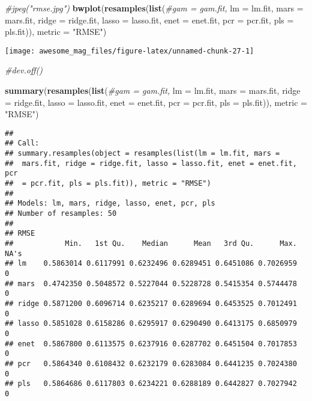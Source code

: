 \documentclass[]{article}
\newenvironment{Shaded}{\begin{snugshade}}{\end{snugshade}}
\newcommand{\KeywordTok}[1]{\textcolor[rgb]{0.13,0.29,0.53}{\textbf{#1}}}
\newcommand{\DataTypeTok}[1]{\textcolor[rgb]{0.13,0.29,0.53}{#1}}
\newcommand{\StringTok}[1]{\textcolor[rgb]{0.31,0.60,0.02}{#1}}
\newcommand{\CommentTok}[1]{\textcolor[rgb]{0.56,0.35,0.01}{\textit{#1}}}
\newcommand{\NormalTok}[1]{#1}
\begin{document}
\begin{Shaded}
\begin{Highlighting}[]
\CommentTok{#jpeg("rmse.jpg")}
\KeywordTok{bwplot}\NormalTok{(}\KeywordTok{resamples}\NormalTok{(}\KeywordTok{list}\NormalTok{(}\CommentTok{#gam = gam.fit,}
                      \DataTypeTok{lm =}\NormalTok{ lm.fit,}
                      \DataTypeTok{mars =}\NormalTok{ mars.fit,}
                      \DataTypeTok{ridge =}\NormalTok{ ridge.fit,}
                      \DataTypeTok{lasso =}\NormalTok{ lasso.fit,}
                      \DataTypeTok{enet =}\NormalTok{ enet.fit,}
                      \DataTypeTok{pcr =}\NormalTok{ pcr.fit,}
                      \DataTypeTok{pls =}\NormalTok{ pls.fit)), }\DataTypeTok{metric =} \StringTok{"RMSE"}\NormalTok{)}
\end{Highlighting}
\end{Shaded}

\texttt{[image: awesome\_mag\_files/figure-latex/unnamed-chunk-27-1]}

\begin{Shaded}
\begin{Highlighting}[]
\CommentTok{#dev.off()}
\end{Highlighting}
\end{Shaded}

\begin{Shaded}
\begin{Highlighting}[]
\KeywordTok{summary}\NormalTok{(}\KeywordTok{resamples}\NormalTok{(}\KeywordTok{list}\NormalTok{(}\CommentTok{#gam = gam.fit,}
                      \DataTypeTok{lm =}\NormalTok{ lm.fit,}
                      \DataTypeTok{mars =}\NormalTok{ mars.fit,}
                      \DataTypeTok{ridge =}\NormalTok{ ridge.fit,}
                      \DataTypeTok{lasso =}\NormalTok{ lasso.fit,}
                      \DataTypeTok{enet =}\NormalTok{ enet.fit,}
                      \DataTypeTok{pcr =}\NormalTok{ pcr.fit,}
                      \DataTypeTok{pls =}\NormalTok{ pls.fit)), }\DataTypeTok{metric =} \StringTok{"RMSE"}\NormalTok{)}
\end{Highlighting}
\end{Shaded}

\begin{verbatim}
## 
## Call:
## summary.resamples(object = resamples(list(lm = lm.fit, mars =
##  mars.fit, ridge = ridge.fit, lasso = lasso.fit, enet = enet.fit, pcr
##  = pcr.fit, pls = pls.fit)), metric = "RMSE")
## 
## Models: lm, mars, ridge, lasso, enet, pcr, pls 
## Number of resamples: 50 
## 
## RMSE 
##            Min.   1st Qu.    Median      Mean   3rd Qu.      Max. NA's
## lm    0.5863014 0.6117991 0.6232496 0.6289451 0.6451086 0.7026959    0
## mars  0.4742350 0.5048572 0.5227044 0.5228728 0.5415354 0.5744478    0
## ridge 0.5871200 0.6096714 0.6235217 0.6289694 0.6453525 0.7012491    0
## lasso 0.5851028 0.6158286 0.6295917 0.6290490 0.6413175 0.6850979    0
## enet  0.5867800 0.6113575 0.6237916 0.6287702 0.6451504 0.7017853    0
## pcr   0.5864340 0.6108432 0.6232179 0.6283084 0.6441235 0.7024380    0
## pls   0.5864686 0.6117803 0.6234221 0.6288189 0.6442827 0.7027942    0
\end{verbatim}
\end{document}
